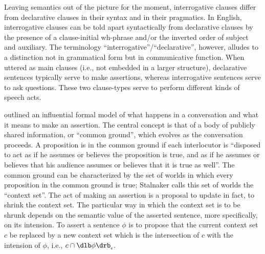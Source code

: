 Leaving semantics out of the picture for the moment, interrogative clauses
differ from declarative clauses in their syntax and in their pragmatics. In
English, interrogative clauses can be told apart syntactically from declarative
clauses by the presence of a clause-initial wh-phrase and/or the inverted order
of subject and auxiliary. The terminology ``interrogative''/``declarative'',
however, alludes to a distinction not in grammatical form but in communicative
function. When uttered as main clauses (i.e., not embedded in a larger
structure), declarative sentences typically serve to make assertions, whereas
interrogative sentences serve to ask questions. These two clause-types serve to
perform different kinds of speech acts.

\cite{stalnaker-1978-assertion} outlined an influential formal model of what
happens in a conversation and what it means to make an assertion. The central
concept is that of a body of publicly shared information, or ``common ground'',
which evolves as the conversation proceeds. A proposition is in the common
ground if each interlocutor is ``disposed to act as if he assumes or believes
the proposition is true, and as if he assumes or believes that his audience
assumes or believes that it is true as well''. The common ground can be
characterized by the set of worlds in which every proposition in the common
ground is true; Stalnaker calls this set of worlds the ``context set''. The act
of making an assertion is a proposal to update \dash in fact, to shrink \dash
the context set. %
%
The particular way in which the context set is to be shrunk depends on the
semantic value of the asserted sentence, more specifically, on its intension. To
assert a sentence $\phi$ is to propose that the current context set $c$ be
replaced by a new context set which is the intersection of $c$ with the
intension of $\phi$, i.e., %
%
$c \cap \svcent{\phi}$.


